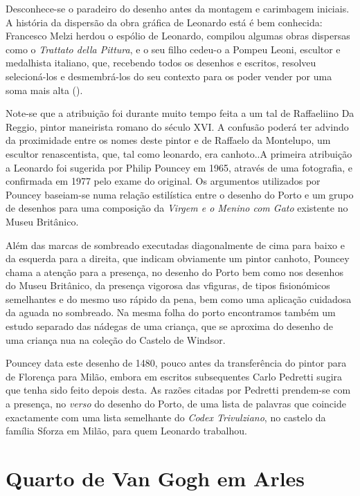 \documentclass{article}
\begin{document}
Desconhece-se o paradeiro do desenho antes da montagem e carimbagem
iniciais. A história da dispersão da obra gráfica de Leonardo está é
bem conhecida: Francesco Melzi herdou o espólio de Leonardo, compilou
algumas obras dispersas como o \emph{Trattato della Pittura}, e o seu
filho cedeu-o a Pompeu Leoni, escultor e medalhista italiano, que,
recebendo todos os desenhos e escritos, resolveu selecioná-los e
desmembrá-los do seu contexto para os poder vender por uma soma mais
alta (\cite{wiki-leoni}).

Note-se que a atribuição foi durante muito tempo feita a um tal de
Raffaeliino Da Reggio, pintor maneirista romano do século XVI. A
confusão poderá ter advindo da proximidade entre os nomes deste pintor
e de Raffaelo da Montelupo, um escultor renascentista, que, tal como 
leonardo, era canhoto..A primeira atribuição a Leonardo foi sugerida
por Philip Pouncey em 1965, através de uma fotografia, e confirmada em
1977 pelo exame do original. Os argumentos utilizados por Pouncey
baseiam-se numa relação estilística entre o desenho do Porto e um
grupo de desenhos para uma composição da \emph{Virgem e o Menino com
  Gato} existente no Museu Britânico.

Além das marcas de sombreado executadas diagonalmente de cima para
baixo e da esquerda para a direita, que indicam obviamente um pintor
canhoto, Pouncey chama a atenção para a presença, no desenho do Porto
bem como nos desenhos do Museu Britânico, da presença vigorosa das
vfiguras, de tipos fisionómicos semelhantes e do mesmo uso rápido da
pena, bem como uma aplicação cuidadosa da aguada no sombreado. Na
mesma folha do porto encontramos também um estudo separado das nádegas
de uma criança, que se aproxima do desenho de uma criança nua na
coleção do Castelo de Windsor.

Pouncey data este desenho de 1480, pouco antes da transferência do
pintor para de Florença para Milão, embora em escritos subsequentes
Carlo Pedretti sugira que tenha sido feito depois desta. As razões
citadas por Pedretti prendem-se com a presença, no \emph{verso} do
desenho do Porto, de uma lista de palavras que coincide exactamente
com uma lista semelhante do \emph{Codex Trivulziano}, no castelo da
família Sforza em Milão, para quem Leonardo trabalhou.

\section{Quarto de Van Gogh em Arles}
\end{document}
